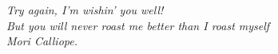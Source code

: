 \begin{titlepage}
\nonumber
\null {}
\begin{flushright}

\textit{Try again, I'm wishin' you well! \\
But you will never roast me better than I roast myself \\
Mori Calliope.}

\end{flushright}
\end{titlepage}